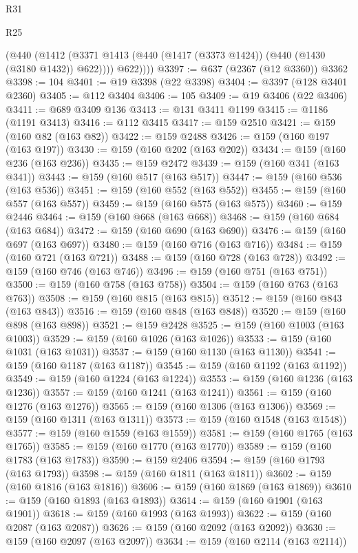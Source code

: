 \begin{lexlean}{R31}
\begin{lexlean}{R25}
\begin{coremodule}
{{{{{{{{{{{{{{{{{{{{{{{{{{{{{{{{{{{{{{{{{{{{{{{{{{{{{{{{{{{{{{{{{{{{{{{{{{{{{{{{{{{{{{{{{{{{{{{{{{{{{{{{{{{{{{{{{{{{{{{{{{{{{{{{{{{{{{{{{{{{{{{{{{{{{{{{{{{{{{{{{{{{{{{{{{{{{{{{{{{{{{{{{{{{{{{{{{{{{{{          (@440
            (@1412 (@3371 @1413 (@440 (@1417 (@3373 @1424)) (@440 (@1430 (@3180 @1432)) @622))))
            @622))))
@3397 := @637 (@2367 (@12 @3360)) @3362
@3398 := 104
@3401 := @19 @3398 (@22 @3398)
@3404 := @3397 (@128 @3401 @2360)
@3405 := @112 @3404
@3406 := 105
@3409 := @19 @3406 (@22 @3406)
@3411 := @689 @3409 @136
@3413 := @131 @3411 @1199
@3415 := @1186 (@1191 @3413)
@3416 := @112 @3415
@3417 := @159 @2510
@3421 := @159 (@160 @82 (@163 @82))
@3422 := @159 @2488
@3426 := @159 (@160 @197 (@163 @197))
@3430 := @159 (@160 @202 (@163 @202))
@3434 := @159 (@160 @236 (@163 @236))
@3435 := @159 @2472
@3439 := @159 (@160 @341 (@163 @341))
@3443 := @159 (@160 @517 (@163 @517))
@3447 := @159 (@160 @536 (@163 @536))
@3451 := @159 (@160 @552 (@163 @552))
@3455 := @159 (@160 @557 (@163 @557))
@3459 := @159 (@160 @575 (@163 @575))
@3460 := @159 @2446
@3464 := @159 (@160 @668 (@163 @668))
@3468 := @159 (@160 @684 (@163 @684))
@3472 := @159 (@160 @690 (@163 @690))
@3476 := @159 (@160 @697 (@163 @697))
@3480 := @159 (@160 @716 (@163 @716))
@3484 := @159 (@160 @721 (@163 @721))
@3488 := @159 (@160 @728 (@163 @728))
@3492 := @159 (@160 @746 (@163 @746))
@3496 := @159 (@160 @751 (@163 @751))
@3500 := @159 (@160 @758 (@163 @758))
@3504 := @159 (@160 @763 (@163 @763))
@3508 := @159 (@160 @815 (@163 @815))
@3512 := @159 (@160 @843 (@163 @843))
@3516 := @159 (@160 @848 (@163 @848))
@3520 := @159 (@160 @898 (@163 @898))
@3521 := @159 @2428
@3525 := @159 (@160 @1003 (@163 @1003))
@3529 := @159 (@160 @1026 (@163 @1026))
@3533 := @159 (@160 @1031 (@163 @1031))
@3537 := @159 (@160 @1130 (@163 @1130))
@3541 := @159 (@160 @1187 (@163 @1187))
@3545 := @159 (@160 @1192 (@163 @1192))
@3549 := @159 (@160 @1224 (@163 @1224))
@3553 := @159 (@160 @1236 (@163 @1236))
@3557 := @159 (@160 @1241 (@163 @1241))
@3561 := @159 (@160 @1276 (@163 @1276))
@3565 := @159 (@160 @1306 (@163 @1306))
@3569 := @159 (@160 @1311 (@163 @1311))
@3573 := @159 (@160 @1548 (@163 @1548))
@3577 := @159 (@160 @1559 (@163 @1559))
@3581 := @159 (@160 @1765 (@163 @1765))
@3585 := @159 (@160 @1770 (@163 @1770))
@3589 := @159 (@160 @1783 (@163 @1783))
@3590 := @159 @2406
@3594 := @159 (@160 @1793 (@163 @1793))
@3598 := @159 (@160 @1811 (@163 @1811))
@3602 := @159 (@160 @1816 (@163 @1816))
@3606 := @159 (@160 @1869 (@163 @1869))
@3610 := @159 (@160 @1893 (@163 @1893))
@3614 := @159 (@160 @1901 (@163 @1901))
@3618 := @159 (@160 @1993 (@163 @1993))
@3622 := @159 (@160 @2087 (@163 @2087))
@3626 := @159 (@160 @2092 (@163 @2092))
@3630 := @159 (@160 @2097 (@163 @2097))
@3634 := @159 (@160 @2114 (@163 @2114))
}}}}}}}}}}}}}}}}}}}}}}}}}}}}}}}}}}}}}}}}}}}}}}}}}}}}}}}}}}}}}}}}}}}}}}}}}}}}}}}}}}}}}}}}}}}}}}}}}}}}}}}}}}}}}}}}}}}}}}}}}}}}}}}}}}}}}}}}}}}}}}}}}}}}}}}}}}}}}}}}}}}}}}}}}}}}}}}}}}}}}}}}}}}}}}}}}}}}}}}
\end{coremodule}
\end{lexlean}
\end{lexlean}
